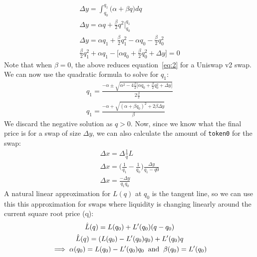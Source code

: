 \documentclass[11pt]{article}
\begin{document}
\begin{gather}
    \Delta y = \int_{q_0}^{q_1} \big( \alpha + \beta q \big) dq \nonumber \\
    \Delta y = \alpha q + \frac{\beta}{2} q^2 \bigg |_{q_0}^{q_1} \nonumber \\
    \Delta y = \alpha q_1 + \frac{\beta}{2} q_1^2 - \alpha q_0 - \frac{\beta}{2} q_0^2 \label{eq:14}\\
    \frac{\beta}{2} q_1^2 + \alpha q_1 - \big[ \alpha q_0 + \frac{\beta}{2} q_0^2 + \Delta y \big] = 0 \nonumber
\end{gather}
Note that when $\beta = 0$, the above reduces equation~\eqref{eq:2} for a Uniswap v2 swap. We can now use the quadratic formula to solve for $q_1$:
\begin{gather}
    q_1 = \frac{-\alpha \pm \sqrt{\alpha^2 - 4 \frac{\beta}{2} \big[ \alpha q_0 + \frac{\beta}{2} q_0^2 + \Delta y \big]}}{2 \frac{\beta}{2}} \nonumber \\
    q_1 = \frac{-\alpha + \sqrt{(\alpha + \beta q_0)^2 + 2 \beta \Delta y}}{\beta} \label{eq:15}
\end{gather}
We discard the negative solution as $q > 0$. Now, since we know what the final price is for a swap of size $\Delta y$, we can also calculate the amount of \texttt{token0} for the swap:
\begin{gather}
    \Delta x = \Delta \frac{1}{q} L \nonumber \\
    \Delta x = \bigg( \frac{1}{q_1} - \frac{1}{q_0} \bigg) \frac{\Delta y}{q_1 - q0} \nonumber \\
    \Delta x = \frac{-\Delta y}{q_1 q_0}
\end{gather}
A natural linear approximation for $L(q)$ at $q_0$ is the tangent line, so we can use this this approximation for swaps where liquidity is changing linearly around the current square root price (q):
\begin{gather*}
    \hat{L}(q) = L(q_0) + L'(q_0) (q - q_0) \\
    \hat{L}(q) = (L(q_0) - L'(q_0) q_0) + L'(q_0) q  \\
    \implies \alpha(q_0) = L(q_0) - L'(q_0) q_0 \hspace{0.2cm} \text{and} \hspace{0.2cm} \beta(q_0) = L'(q_0)
\end{gather*}
\end{document}
